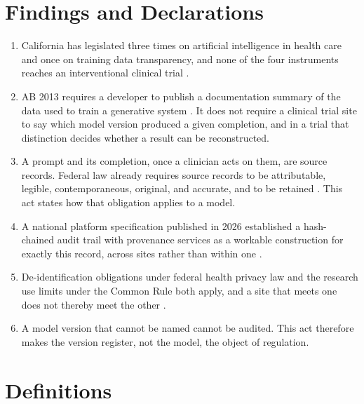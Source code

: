 
\section{Findings and Declarations}

\begin{enumerate}
\item California has legislated three times on artificial intelligence in
  health care and once on training data transparency, and none of the four
  instruments reaches an interventional clinical trial
  \cite{ab3030_2024,ab489_2025,sb1120_2024,ab2013_2024}.

\item AB 2013 requires a developer to publish a documentation summary of the
  data used to train a generative system \cite{ab2013_2024}. It does not require
  a clinical trial site to say which model version produced a given completion,
  and in a trial that distinction decides whether a result can be reconstructed.

\item A prompt and its completion, once a clinician acts on them, are source
  records. Federal law already requires source records to be attributable,
  legible, contemporaneous, original, and accurate, and to be retained
  \cite{cfr11,cfr312}. This act states how that obligation applies to a model.

\item A national platform specification published in 2026 established a
  hash-chained audit trail with provenance services as a workable construction
  for exactly this record, across sites rather than within one
  \cite{natplatform2026}.

\item De-identification obligations under federal health privacy law and the
  research use limits under the Common Rule both apply, and a site that meets one
  does not thereby meet the other \cite{cfr45part164,cfr45part46}.

\item A model version that cannot be named cannot be audited. This act therefore
  makes the version register, not the model, the object of regulation.
\end{enumerate}

\section{Definitions}

